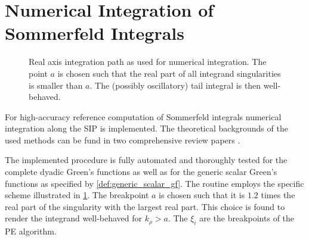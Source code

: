 \section{Numerical Integration of Sommerfeld Integrals}

\begin{figure}
    \centering
    \caption{Real axis integration path as used for numerical integration.
    The point $a$ is chosen such that the real part of all integrand
    singularities is smaller than $a$.
    The (possibly oscillatory) tail integral is then well-behaved.}
    \label{fig:sip_numerical_integration}
\end{figure}

For high-accuracy reference computation of Sommerfeld integrals numerical
integration along the \ac{SIP} is implemented.
The theoretical backgrounds of the used methods can be fund in two comprehensive 
review papers \cite{Michalski1998,Michalski2016a}.

The implemented procedure is fully automated and thoroughly tested for the
complete dyadic Green's functions as well as for the generic scalar Green's
functions as specified by \cref{def:generic_scalar_gf}.
The routine employs the specific scheme illustrated in
\cref{fig:sip_numerical_integration}.
The breakpoint $a$ is chosen such that it is $\num{1.2}$ times the real part
of the singularity with the largest real part.
This choice is found to render the integrand well-behaved for $k_\rho > a$.
The $\xi_i$ are the breakpoints of the \ac{PE} algorithm.

